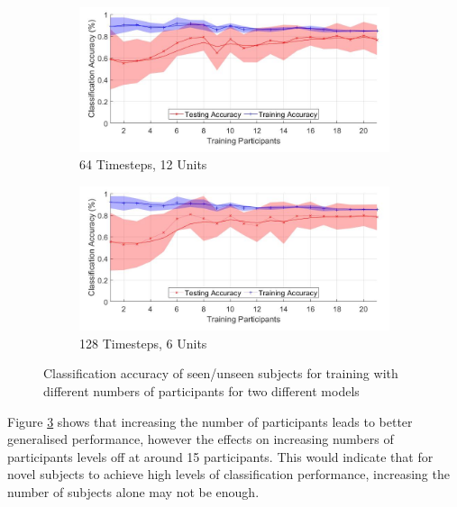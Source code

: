 \documentclass[sensors,article,submit,moreauthors,pdftex]{Definitions/mdpi}
\begin{document}
\begin{figure}[!htb]
    \centering
    \begin{subfigure}[b]{0.49\textwidth}
         \centering
        \includegraphics[width=\textwidth]{Figures/results/number_participants_64x12.jpg}
        \caption{64 Timesteps, 12 Units}
        \label{fig:subject_num_generalisation_64x12}
    \end{subfigure}
    \hfil
    \begin{subfigure}[b]{0.49\textwidth}
         \centering
        \includegraphics[width=\textwidth]{Figures/results/number_participants_128x6.jpg}
        \caption{128 Timesteps, 6 Units}
        \label{fig:subject_num_generalisation_128x6}
    \end{subfigure}
    \caption{Classification accuracy of seen/unseen subjects for training with different numbers of participants for two different models}
    \label{fig:subject_num_generalisation}
\end{figure}

Figure \ref{fig:subject_num_generalisation} shows that increasing the number of participants leads to better generalised performance, however the effects on increasing numbers of participants levels off at around 15 participants. This would indicate that for novel subjects to achieve high levels of classification performance, increasing the number of subjects alone may not be enough.
\end{document}

